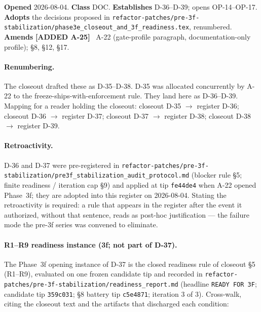 \documentclass[
  10pt,
]{article}
\newcommand{\amdnew}[1]{{\color{amdcolor}\footnotesize\textbf{[ADDED #1]}}\ }
\begin{document}
\textbf{Opened} 2026-08-04. \textbf{Class} DOC. \textbf{Establishes} D-36--D-39; opens OP-14--OP-17. \textbf{Adopts} the decisions proposed in \texttt{refactor-patches/pre-3f-stabilization/phase3e\_closeout\_and\_3f\_readiness.tex}, renumbered. \textbf{Amends} \amdnew{A-25} A-22 (gate-profile paragraph, documentation-only profile); §8, §12, §17.

\paragraph{Renumbering.}
The closeout drafted these as D-35--D-38. D-35 was allocated concurrently by A-22 to the freeze-ships-with-enforcement rule. They land here as D-36--D-39. Mapping for a reader holding the closeout: closeout D-35 $\rightarrow$ register D-36; closeout D-36 $\rightarrow$ register D-37; closeout D-37 $\rightarrow$ register D-38; closeout D-38 $\rightarrow$ register D-39.

\paragraph{Retroactivity.}
D-36 and D-37 were pre-registered in \texttt{refactor-patches/pre-3f-stabilization/pre3f\_stabilization\_audit\_protocol.md} (blocker rule §5; finite readiness / iteration cap §9) and applied at tip \texttt{fe44de4} when A-22 opened Phase~3f; they are adopted into this register on 2026-08-04. Stating the retroactivity is required: a rule that appears in the register after the event it authorized, without that sentence, reads as post-hoc justification --- the failure mode the pre-3f series was convened to eliminate.

\paragraph{R1--R9 readiness instance (3f; not part of D-37).}
The Phase~3f opening instance of D-37 is the closed readiness rule of closeout §5 (R1--R9), evaluated on one frozen candidate tip and recorded in \texttt{refactor-patches/pre-3f-stabilization/readiness\_report.md} (headline \texttt{READY FOR 3F}; candidate tip \texttt{359c031}; §8 battery tip \texttt{c5e4871}; iteration 3 of 3). Cross-walk, citing the closeout text and the artifacts that discharged each condition:
\end{document}
